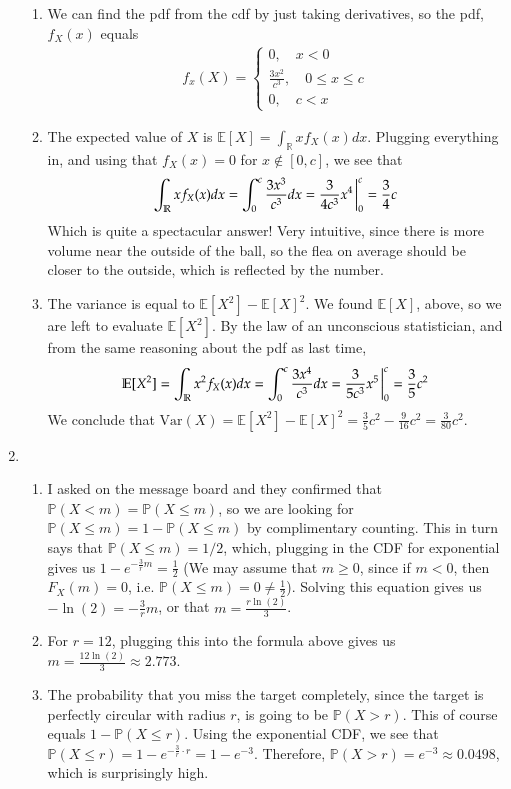 \documentclass[12pt]{article}
\def\mbb#1{\mathbb{#1}}
\def \R{\mbb{R}}
\renewcommand{\P}{\mathbb{P}}
\newcommand{\E}{\mathbb{E}}
\newcommand{\Var}{\mathrm{Var}}
\begin{document}
\begin{enumerate}[leftmargin=\labelsep]
\begin{enumerate}
			\item We can find the pdf from the cdf by just taking derivatives, so the pdf, $f_X(x)$ equals
			\begin{align*}
				f_x(X) = \begin{cases}
					0, \quad x < 0 \\
					\frac{3x^2}{c^3}, \quad 0 \leq x \leq c \\
					0, \quad c < x
				\end{cases}
			\end{align*}
			
			\item The expected value of $X$ is $\E[X] = \int_\R xf_X(x)dx$. Plugging everything in, and using that $f_X(x) = 0$ for $x \not \in [0, c]$, we see that
			\begin{align*}
				\int_\R xf_X(x)dx = \int_0^c \frac{3x^3}{c^3}dx = \frac3{4c^3} x^4 \eval_0^c = \frac34 c
			\end{align*}
			Which is quite a spectacular answer! Very intuitive, since there is more volume near the outside of the ball, so the flea on average should be closer to the outside, which is reflected by the number.
			
			\item The variance is equal to $\E[X^2] - \E[X]^2$. We found $\E[X]$, above, so we are left to evaluate $\E[X^2]$. By the law of an unconscious statistician, and from the same reasoning about the pdf as last time,
			\begin{align*}
				\E[X^2] = \int_\R x^2f_X(x)dx = \int_0^c \frac{3x^4}{c^3}dx = \frac{3}{5c^3} x^5\eval_0^c = \frac{3}{5}c^2
			\end{align*}
			We conclude that $\Var(X) = \E[X^2] - \E[X]^2 = \frac35 c^2 - \frac{9}{16} c^2 = \frac3{80}c^2$.
		\end{enumerate}
	
		\newpage
		\item \begin{enumerate}
			\item I asked on the message board and they confirmed that $\P(X < m) = \P(X \leq m)$, so we are looking for $\P(X \leq m) = 1 - \P(X \leq m)$ by complimentary counting. This in turn says that $\P(X \leq m) = 1/2$, which, plugging in the CDF for exponential gives us $1 - e^{-\frac3r m} = \frac12$ (We may assume that $m \geq 0$, since if $m < 0$, then $F_X(m) = 0$, i.e. $\P(X \leq m) = 0 \neq \frac12$). Solving this equation gives us $-\ln(2) = -\frac3r m$, or that $m = \frac{r\ln(2)}{3}$.
			
			\item For $r = 12$, plugging this into the formula above gives us $m = \frac{12 \ln(2)}{3} \approx 2.773$.
			
			\item The probability that you miss the target completely, since the target is perfectly circular with radius $r$, is going to be $\P(X > r)$. This of course equals $1 - \P(X \leq r)$. Using the exponential CDF, we see that $\P(X \leq r) = 1 - e^{-\frac3r \cdot r} = 1 - e^{-3}$. Therefore, $\P(X > r) = e^{-3} \approx 0.0498$, which is surprisingly high.
		\end{enumerate}
	\end{enumerate}
\end{document}
